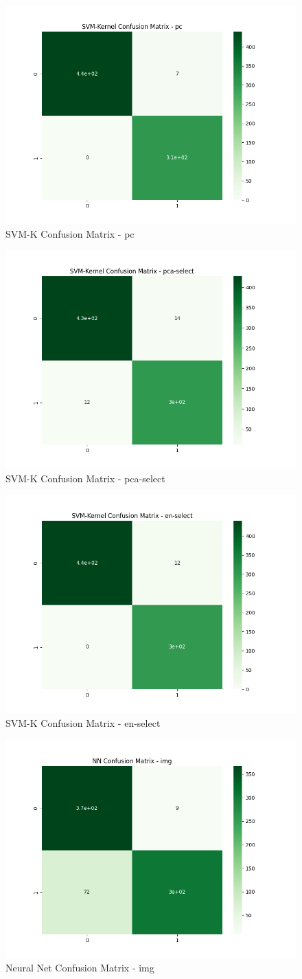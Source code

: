 \documentclass{article}
\begin{document}
\begin{multicols}{2}
\begin{figure}[H]
    \centering
    \includegraphics[width = .48\textwidth]{confusion/svmK-confusion-pc.png}
    \caption{SVM-K Confusion Matrix - pc}
    \label{fig:enter-label}
\end{figure}

\begin{figure}[H]
    \centering
    \includegraphics[width = .48\textwidth]{confusion/svmK-confusion-pca-select.png}
    \caption{SVM-K Confusion Matrix - pca-select}
    \label{fig:enter-label}
\end{figure}

\begin{figure}[H]
    \centering
    \includegraphics[width = .48\textwidth]{confusion/svmK-confusion-en-select.png}
    \caption{SVM-K Confusion Matrix - en-select}
    \label{fig:enter-label}
\end{figure}

\begin{figure}[H]
    \centering
    \includegraphics[width = .48\textwidth]{confusion/nn-confusion-img.png}
    \caption{Neural Net Confusion Matrix - img}
    \label{fig:enter-label}
\end{figure}


\end{multicols}
\end{document}
